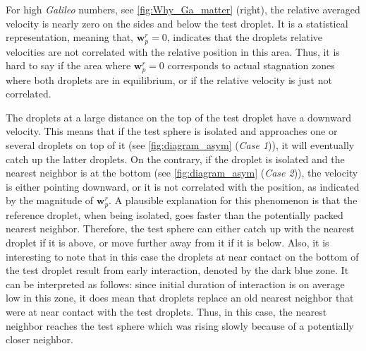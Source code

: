

For high \textit{Galileo} numbers, see \ref{fig:Why_Ga_matter} (right), the relative averaged velocity is nearly zero on the sides and below the test droplet. 
It is a statistical representation, meaning that, $\textbf{w}_p^r = 0$, indicates that the droplets relative  velocities are not correlated with the relative position in this area. 
Thus, it is hard to say if the area where $\textbf{w}_p^r = 0$ corresponds to actual stagnation zones where both droplets are in equilibrium, or if the relative velocity is just not correlated. 

The droplets at a large distance on the top of the test droplet have a downward velocity. 
This means that if the test sphere is isolated and approaches one or several  droplets on top of it (see \ref{fig:diagram_asym} (\textit{Case 1})), it will eventually catch up the latter droplets. 
On the contrary, if the droplet is isolated and the nearest neighbor is at the bottom (see \ref{fig:diagram_asym} (\textit{Case 2})), the velocity is either pointing downward, or it is not correlated with the position, as indicated by the magnitude of $\textbf{w}_p^r$. 
A plausible explanation for this phenomenon is that the reference droplet, when being isolated, goes faster than the potentially packed nearest neighbor.
Therefore, the test sphere can either catch up with the nearest droplet if it is above, or move further away from it if it is below.
Also, it is interesting to note that in this case the droplets at near contact on the bottom of the test droplet result from early interaction, denoted by the dark blue zone. 
It can be interpreted as follows: since 
initial duration of interaction is on average low in this zone, it does mean that droplets replace an old nearest neighbor that were at near contact with the test droplets. 
Thus, in this case, the nearest neighbor reaches the test sphere which was rising slowly because of a potentially closer neighbor. 

